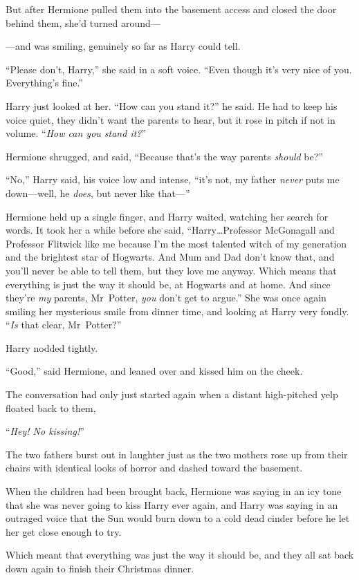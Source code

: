 But after Hermione pulled them into the basement access and closed the door behind them, she’d turned around—

—and was smiling, genuinely so far as Harry could tell.

“Please don’t, Harry,” she said in a soft voice. “Even though it’s very nice of you. Everything’s fine.”

Harry just looked at her. “How can you stand it?” he said. He had to keep his voice quiet, they didn’t want the parents to hear, but it rose in pitch if not in volume. “\emph{How can you stand it?}”

Hermione shrugged, and said, “Because that’s the way parents \emph{should} be?”

“No,” Harry said, his voice low and intense, “it’s not, my father \emph{never} puts me down—well, he \emph{does}, but never like that—”

Hermione held up a single finger, and Harry waited, watching her search for words. It took her a while before she said, “Harry…Professor McGonagall and Professor Flitwick like me because I’m the most talented witch of my generation and the brightest star of Hogwarts. And Mum and Dad don’t know that, and you’ll never be able to tell them, but they love me anyway. Which means that everything is just the way it should be, at Hogwarts and at home. And since they’re \emph{my} parents, Mr~Potter, \emph{you} don’t get to argue.” She was once again smiling her mysterious smile from dinner time, and looking at Harry very fondly. “\emph{Is} that clear, Mr~Potter?”

Harry nodded tightly.

“Good,” said Hermione, and leaned over and kissed him on the cheek.

\later

The conversation had only just started again when a distant high-pitched yelp floated back to them,

“\emph{Hey! No kissing!}”

The two fathers burst out in laughter just as the two mothers rose up from their chairs with identical looks of horror and dashed toward the basement.

When the children had been brought back, Hermione was saying in an icy tone that she was never going to kiss Harry ever again, and Harry was saying in an outraged voice that the Sun would burn down to a cold dead cinder before he let her get close enough to try.

Which meant that everything was just the way it should be, and they all sat back down again to finish their Christmas dinner.

